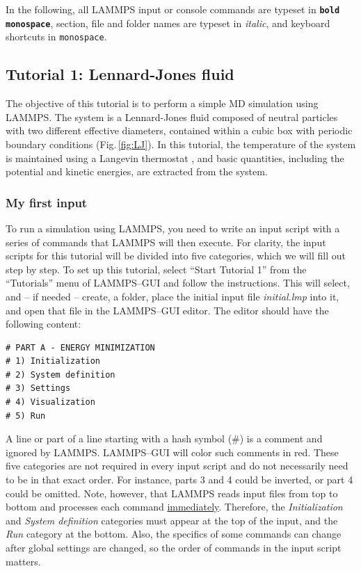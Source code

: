 \documentclass[9pt,tutorial]{livecoms}
\renewcommand{\emph}[1]{\underline{#1}}
\newcommand{\lmpcmd}[1]{\texttt{\normalsize\bfseries\textcolor{command}{#1}}}
\begin{document}
In the following, all LAMMPS input or console commands are typeset in
\lmpcmd{bold monospace}, section, file and folder names are typeset in
\textit{italic}, and keyboard shortcuts in \texttt{monospace}.

\subsection{Tutorial 1: Lennard-Jones fluid}
\label{lennard-jones-label}

The objective of this tutorial is to perform a simple MD simulation
using LAMMPS.  The system is a Lennard-Jones fluid composed of neutral
particles with two different effective diameters, contained within a
cubic box with periodic boundary conditions (Fig.\,\ref{fig:LJ}).  In
this tutorial, the temperature of the system is maintained using a
Langevin thermostat \cite{schneider1978molecular}, and basic quantities,
including the potential and kinetic energies, are extracted from the
system.

\subsubsection{My first input}

To run a simulation using LAMMPS, you need to write an input script with
a series of commands that LAMMPS will then execute.  For clarity, the
input scripts for this tutorial will be divided into five categories,
which we will fill out step by step.  To set up this tutorial, select
``Start Tutorial 1'' from the ``Tutorials'' menu of LAMMPS--GUI and
follow the instructions.  This will select, and -- if needed -- create,
a folder, place the initial input file \textit{initial.lmp} into it, and
open that file in the LAMMPS--GUI editor.  The editor should have the
following content:
\begin{lstlisting}
# PART A - ENERGY MINIMIZATION
# 1) Initialization
# 2) System definition
# 3) Settings
# 4) Visualization
# 5) Run
\end{lstlisting}

A line or part of a line starting with a hash symbol ($\#$) is a comment
and ignored by LAMMPS.  LAMMPS--GUI will color such comments in red.
These five categories are not required in every input script and do not
necessarily need to be in that exact order.  For instance, parts 3 and 4
could be inverted, or part 4 could be omitted.  Note, however, that
LAMMPS reads input files from top to bottom and processes each command
\emph{immediately}.  Therefore, the \textit{Initialization} and
\textit{System definition} categories must appear at the top of the
input, and the \textit{Run} category at the bottom.  Also, the specifics
of some commands can change after global settings are changed, so the
order of commands in the input script matters.
\end{document}
